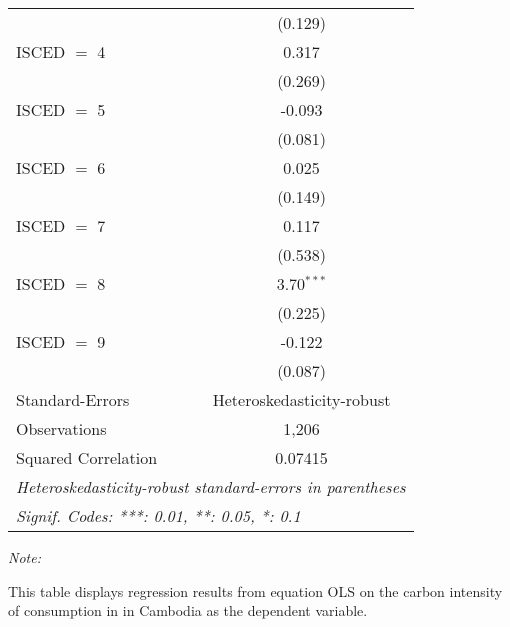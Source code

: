 \begin{table}[htbp!]
\begin{adjustbox}{width = 1\textwidth, max height = 0.95\textheight, center}
\begin{threeparttable}[b]
\begin{tabular}{lc}
                                & (0.129)\\   
            ISCED $=$ 4         & 0.317\\   
                                & (0.269)\\   
            ISCED $=$ 5         & -0.093\\   
                                & (0.081)\\   
            ISCED $=$ 6         & 0.025\\   
                                & (0.149)\\   
            ISCED $=$ 7         & 0.117\\   
                                & (0.538)\\   
            ISCED $=$ 8         & 3.70$^{***}$\\   
                                & (0.225)\\   
            ISCED $=$ 9         & -0.122\\   
                                & (0.087)\\   
            \midrule 
            Standard-Errors     & Heteroskedasticity-robust \\   
            Observations        & 1,206\\  
            Squared Correlation & 0.07415\\  
            \midrule \midrule
            \multicolumn{2}{l}{\emph{Heteroskedasticity-robust standard-errors in parentheses}}\\
            \multicolumn{2}{l}{\emph{Signif. Codes: ***: 0.01, **: 0.05, *: 0.1}}\\
         \end{tabular}
         
         \begin{tablenotes}\item \medskip \textit{Note:}
            \item This table displays regression results from equation OLS on the carbon intensity of consumption in  in Cambodia as the dependent variable. 
         \end{tablenotes}
      \end{threeparttable}
   \end{adjustbox}
\end{table}


